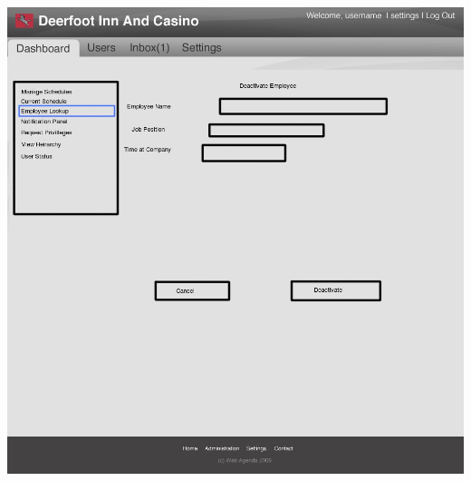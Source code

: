 \documentclass[letterpaper,12pt]{report}
\begin{document}
\begin{landscape}
\begin{center}
 \includegraphics[scale=0.3]{prototypes/Screen6.png}
\end{center}
\newpage


\end{landscape}
\end{document}
